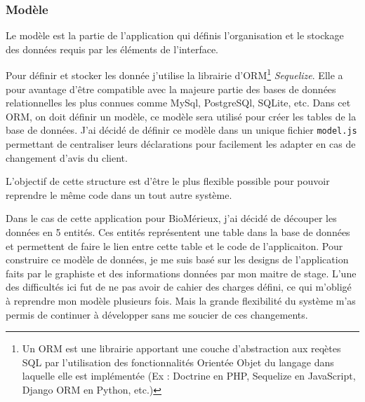 \subsubsection{Modèle}

Le modèle est la partie de l'application qui définis l'organisation et le stockage des données requis par les éléments de l'interface.

Pour définir et stocker les donnée j'utilise la librairie d'ORM\footnote{Un ORM est une librairie apportant une couche d'abstraction aux reqètes SQL par l'utilisation des fonctionnalités Orientée Objet du langage dans laquelle elle est implémentée (Ex : Doctrine en PHP, Sequelize en JavaScript, Django ORM en Python, etc.)} \emph{Sequelize}.
Elle a pour avantage d'être compatible avec la majeure partie des bases de données relationnelles les plus connues comme MySql, PostgreSQl, SQLite, etc.
Dans cet ORM, on doit définir un modèle, ce modèle sera utilisé pour créer les tables de la base de données.
J'ai décidé de définir ce modèle dans un unique fichier \texttt{model.js} permettant de centraliser leurs déclarations pour facilement les adapter en cas de changement d'avis du client.

L'objectif de cette structure est d'être le plus flexible possible pour pouvoir reprendre le même code dans un tout autre système.

\bigskip

Dans le cas de cette application pour BioMérieux, j'ai décidé de découper les données en 5 entités.
Ces entités représentent une table dans la base de données et permettent de faire le lien entre cette table et le code de l'applicaiton.
Pour construire ce modèle de données, je me suis basé sur les designs de l'application faits par le graphiste et des informations données par mon maitre de stage.
L'une des difficultés ici fut de ne pas avoir de cahier des charges défini, ce qui m'obligé à reprendre mon modèle plusieurs fois.
Mais la grande flexibilité du système m'as permis de continuer à développer sans me soucier de ces changements.

\bigskip

